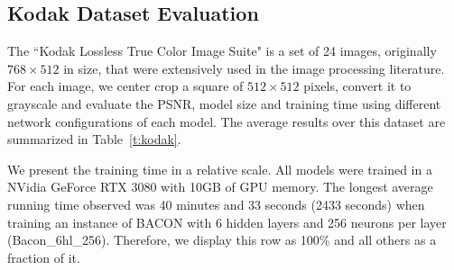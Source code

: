 \subsection{Kodak Dataset Evaluation}\label{sub:kodak}

The ``Kodak Lossless True Color Image Suite" is a set of 24 images, originally $768 \times 512$ in size, that were extensively used in the image processing literature. For each image, we center crop a square of $512\times 512$ pixels, convert it to grayscale and evaluate the PSNR, model size and training time using different network configurations of each model. The average results over this dataset are summarized in Table~\ref{t:kodak}. 

We present the training time in a relative scale. All models were trained in a NVidia GeForce RTX 3080 with 10GB of GPU memory. The longest average running time observed was 40 minutes and 33 seconds (2433 seconds) when training an instance of BACON with 6 hidden layers and 256 neurons per layer (Bacon\_6hl\_256). Therefore, we display this row as 100\% and all others as a fraction of it.


